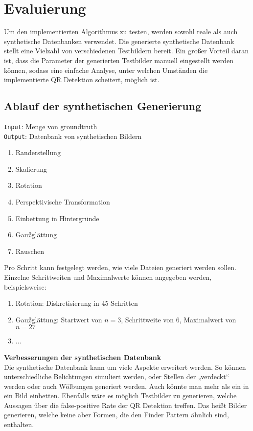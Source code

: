 \chapter{Evaluierung}

Um den implementierten Algorithmus zu testen, werden sowohl reale als auch synthetische Datenbanken verwendet. Die generierte synthetische Datenbank stellt eine Vielzahl von verschiedenen Testbildern bereit. Ein großer Vorteil daran ist, dass die Parameter der generierten Testbilder manuell eingestellt werden können, sodass eine einfache Analyse, unter welchen Umständen die implementierte QR Detektion scheitert, möglich ist.

\section{Ablauf der synthetischen Generierung}

\texttt{Input}: Menge von groundtruth \QRCodes \\
\texttt{Output}: Datenbank von synthetischen Bildern

\begin{enumerate}
	\item Randerstellung
	\item Skalierung
	\item Rotation
	\item Perspektivische Transformation
	\item Einbettung in Hintergründe
	\item Gaußglättung
	\item Rauschen
\end{enumerate}


Pro Schritt kann festgelegt werden, wie viele Dateien generiert werden sollen.
Einzelne Schrittweiten und Maximalwerte können angegeben werden, beispielsweise:
\begin{enumerate}
	\item Rotation: Diskretisierung in $45$ Schritten
	\item Gaußglättung: Startwert von $n=3$, Schrittweite von $6$, Maximalwert von $n=27$
	\item ...
\end{enumerate}

\textbf{Verbesserungen der synthetischen Datenbank}\\
Die synthetische Datenbank kann um viele Aspekte erweitert werden. So können unterschiedliche Belichtungen simuliert werden, oder Stellen der \QRCodes „verdeckt“ werden oder auch Wölbungen generiert werden. Auch könnte man mehr als ein \QRCode in ein Bild einbetten.
Ebenfalls wäre es möglich Testbilder zu generieren, welche Aussagen über die false-positive Rate der QR Detektion treffen. Das heißt Bilder generieren, welche keine \QRCodes aber Formen, die den Finder Pattern ähnlich sind, enthalten.

